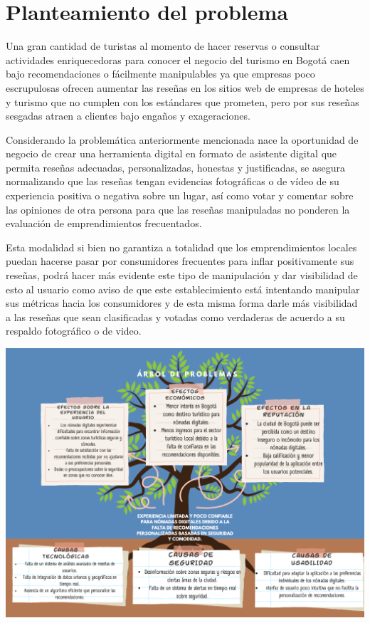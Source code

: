 \section{Planteamiento del problema}
Una gran cantidad de turistas al momento de hacer reservas o consultar actividades enriquecedoras para conocer el negocio del turismo en Bogotá caen bajo recomendaciones o fácilmente manipulables ya que empresas poco escrupulosas ofrecen aumentar las reseñas en los sitios web de empresas de hoteles y turismo que no cumplen con los estándares que prometen, pero por sus reseñas sesgadas atraen a clientes bajo engaños y exageraciones. 

Considerando la problemática anteriormente mencionada nace la oportunidad de negocio de crear una herramienta digital en formato de asistente digital que permita reseñas adecuadas, personalizadas, honestas y justificadas, se asegura normalizando que las reseñas tengan evidencias fotográficas o de vídeo de su experiencia positiva o negativa sobre un lugar, así como votar y comentar sobre las opiniones de otra persona para que las reseñas manipuladas no ponderen la evaluación de emprendimientos frecuentados.  

Esta modalidad si bien no garantiza a totalidad que los emprendimientos locales puedan hacerse pasar por consumidores frecuentes para inflar positivamente sus reseñas, podrá hacer más evidente este tipo de manipulación y dar visibilidad de esto al usuario como aviso de que este establecimiento está intentando manipular sus métricas hacia los consumidores y de esta misma forma darle más visibilidad a las reseñas que sean clasificadas y votadas como verdaderas de acuerdo a su respaldo fotográfico o de video. 
\begin{adjustbox}{
    center,
    caption=[{Arbol de problemas}]{\centering Arbol de problemas. Fuente:Autores},
    label={arbol de problemas},
    nofloat=figure}

    \includegraphics[scale= 0.6]{Content/Images/Gráfica Árbol de problemas emprendimiento (1).png}


\end{adjustbox}






